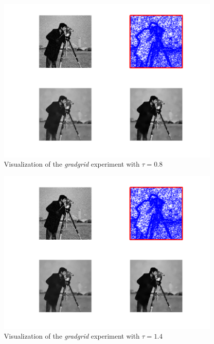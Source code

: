 \documentclass{report}
\begin{document}
\begin{figure}
	\includegraphics[width=\textwidth]{../out/report_gradgrid1.png}
	\caption{Visualization of the \textit{gradgrid} experiment with $\tau = 0.8$}
	\label{vis:gradgrid1}
\end{figure}

\begin{figure}
	\includegraphics[width=\textwidth]{../out/report_gradgrid2.png}
	\caption{Visualization of the \textit{gradgrid} experiment with $\tau = 1.4$}
	\label{vis:gradgrid2}
\end{figure}
\end{document}
